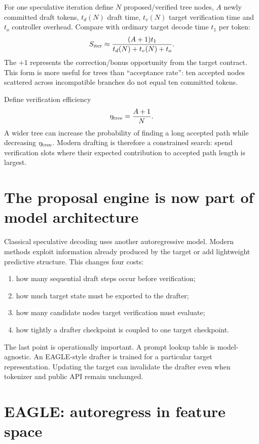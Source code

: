 
For one speculative iteration define $N$ proposed/verified tree nodes, $A$ newly
committed draft tokens, $t_d(N)$ draft time, $t_v(N)$ target verification time and
$t_o$ controller overhead. Compare with ordinary target decode time $t_1$ per token:
\begin{equation}
S_{\rm iter}\approx\frac{(A+1)t_1}{t_d(N)+t_v(N)+t_o}.
\label{eq:modern-speed}
\end{equation}
The $+1$ represents the correction/bonus opportunity from the target contract. This
form is more useful for trees than ``acceptance rate'': ten accepted nodes scattered
across incompatible branches do not equal ten committed tokens.

Define verification efficiency
\begin{equation}
\eta_{\rm tree}=\frac{A+1}{N}.
\end{equation}
A wider tree can increase the probability of finding a long accepted path while
decreasing $\eta_{\rm tree}$. Modern drafting is therefore a constrained search:
spend verification slots where their expected contribution to accepted path length is
largest.

\section{The proposal engine is now part of model architecture}

Classical speculative decoding uses another autoregressive model. Modern methods exploit
information already produced by the target or add lightweight predictive structure.
This changes four costs:
\begin{enumerate}
\item how many sequential draft steps occur before verification;
\item how much target state must be exported to the drafter;
\item how many candidate nodes target verification must evaluate;
\item how tightly a drafter checkpoint is coupled to one target checkpoint.
\end{enumerate}
The last point is operationally important. A prompt lookup table is model-agnostic. An
EAGLE-style drafter is trained for a particular target representation. Updating the
target can invalidate the drafter even when tokenizer and public API remain unchanged.

\section{EAGLE: autoregress in feature space}

